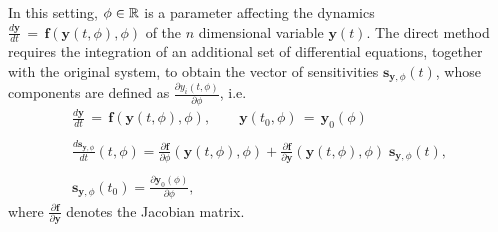 \noindent In this setting, $\phi \in \mathbb{R}$ is a  parameter affecting the dynamics  $\displaystyle \frac{d \mathbf{y}}{dt}\, =\,\mathbf{f}(\mathbf{y}(t,\phi),\phi)$ of the $n$ dimensional variable $\mathbf{y}(t)$. The direct method requires the integration of an additional set of differential equations, together with the original system, to obtain the vector of sensitivities
 $ \mathbf{s}_{\mathbf{y},\phi}(t)$, whose components are defined as $\displaystyle \frac{\partial y_i(t,\phi)}{\partial \phi}$, i.e. 
\begin{equation}\label{eq: compact form ODE sensitivities}
\begin{array}{l}
\displaystyle \frac{d \mathbf{y}}{dt}\, =\,\mathbf{f}(\mathbf{y}(t,\phi),\phi), \qquad  \mathbf{y}(t_0,\phi)\, =\, \mathbf{y}_0(\phi)\\\\
      \displaystyle \frac{d\mathbf{s}_{\mathbf{y},\phi}}{dt}(t,\phi)= \displaystyle \frac{\partial \mathbf{f}}{\partial \phi}(\mathbf{y}(t,\phi),\phi)+\displaystyle \frac{\partial \mathbf{f}}{\partial \mathbf{y}}(\mathbf{y}(t,\phi),\phi)\;\mathbf{s}_{\mathbf{y},\phi}(t),\\\\
     \mathbf{s}_{\mathbf{y},\phi}(t_0)=\displaystyle \frac{\partial \mathbf{y}_0(\phi)}{\partial \phi},
\end{array}
\end{equation}
where $\displaystyle \frac{\partial \mathbf{f}}{\partial \mathbf{y}}$ denotes the Jacobian matrix. 

\bigskip

